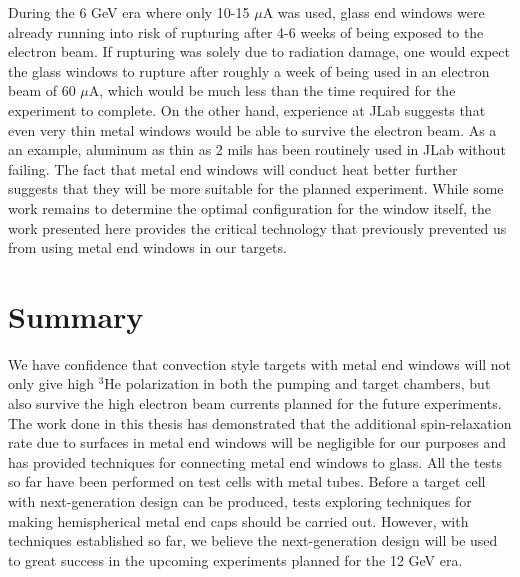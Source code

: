 During the 6 GeV era where only 10-15 $\mu$A was used, glass end windows were already running into risk of rupturing after 4-6 weeks of being exposed to the electron beam. If rupturing was solely due to radiation damage, one would expect the glass windows to rupture after roughly a week of being used in an electron beam of 60 $\mu$A, which would be much less than the time required for the experiment to complete. On the other hand, experience at JLab suggests that even very thin metal windows would be able to survive the electron beam. As a an example, aluminum as thin as 2 mils has been routinely used in JLab without failing. The fact that metal end windows will conduct heat better further suggests that they will be more suitable for the planned experiment. While some work remains to determine the optimal configuration for the window itself, the work presented here provides the critical technology that previously prevented us from using metal end windows in our targets.

\section{Summary}

We have confidence that convection style targets with metal end windows will not only give high $^3$He polarization in both the pumping and target chambers, but also survive the high electron beam currents planned for the future experiments. The work done in this thesis has demonstrated that the additional spin-relaxation rate due to surfaces in metal end windows will be negligible for our purposes and has provided techniques for connecting metal end windows to glass. All the tests so far have been performed on test cells with metal tubes. Before a target cell with next-generation design can be produced, tests exploring techniques for making hemispherical metal end caps should be carried out. However, with techniques established so far, we believe the next-generation design will be used to great success in the upcoming experiments planned for the 12 GeV era.
